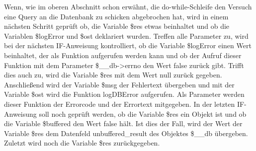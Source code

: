 Wenn, wie im oberen Abschnitt schon erwähnt, die do-while-Schleife den Versuch eine Query an die Datenbank zu schicken abgebrochen hat, wird in einem nächsten Schritt geprüft ob, die Variable \$res etwas beinhaltet und ob die Variablen \$logError und \$ost deklariert wurden. Treffen alle Parameter zu, wird bei der nächsten IF-Anweisung kontrolliert, ob die Variable \$logError einen Wert beinhaltet, der als Funktion aufgerufen werden kann und ob der Aufruf dieser Funktion mit dem Parameter \$\_\_db->errno den Wert false zurück gibt.
Trifft dies auch zu, wird die Variable \$res mit dem Wert null zurück gegeben. Anschließend wird der Variable \$msg der Fehlertext übergeben und mit der Variable \$ost  wird die Funktion logDBError aufgerufen. Als Parameter werden dieser Funktion der Errorcode und der Errortext mitgegeben.
In der letzten IF-Anweisung soll noch geprüft werden, ob die Variable \$res ein Objekt ist und ob die Variable \$buffered den Wert false hält. Ist dies der Fall, wird der Wert der Variable \$res dem Datenfeld unbuffered\_result des Objektes \$\_\_db übergeben. 
Zuletzt wird noch die Variable \$res zurückgegeben.
\newpage

